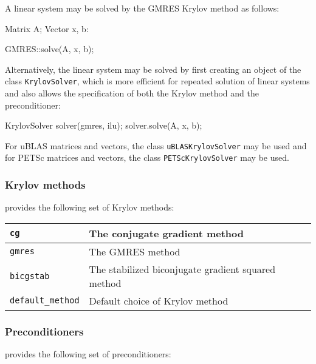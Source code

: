 A linear system may be solved by the GMRES Krylov method as follows:
\begin{code}
Matrix A;
Vector x, b:

GMRES::solve(A, x, b);
\end{code}
Alternatively, the linear system may be solved by first creating an
object of the class \texttt{KrylovSolver}, which is more efficient for
repeated solution of linear systems and also allows the specification
of both the Krylov method and the preconditioner:
\begin{code}
KrylovSolver solver(gmres, ilu);
solver.solve(A, x, b);
\end{code}

For uBLAS matrices and vectors, the class \texttt{uBLASKrylovSolver}
may be used and for PETSc matrices and vectors, the class
\texttt{PETScKrylovSolver} may be used.

\subsubsection{Krylov methods}

\dolfin{} provides the following set of Krylov methods:

\begin{center}
\begin{tabular}{|l|l|}
\hline
\texttt{cg}              & The conjugate gradient method \\
\hline
\texttt{gmres}           & The GMRES method \\
\hline
\texttt{bicgstab}        & The stabilized biconjugate gradient squared
method \\
\hline
\texttt{default\_method} & Default choice of Krylov method \\
\hline
\end{tabular}
\end{center}

\subsubsection{Preconditioners}

\dolfin{} provides the following set of preconditioners:

